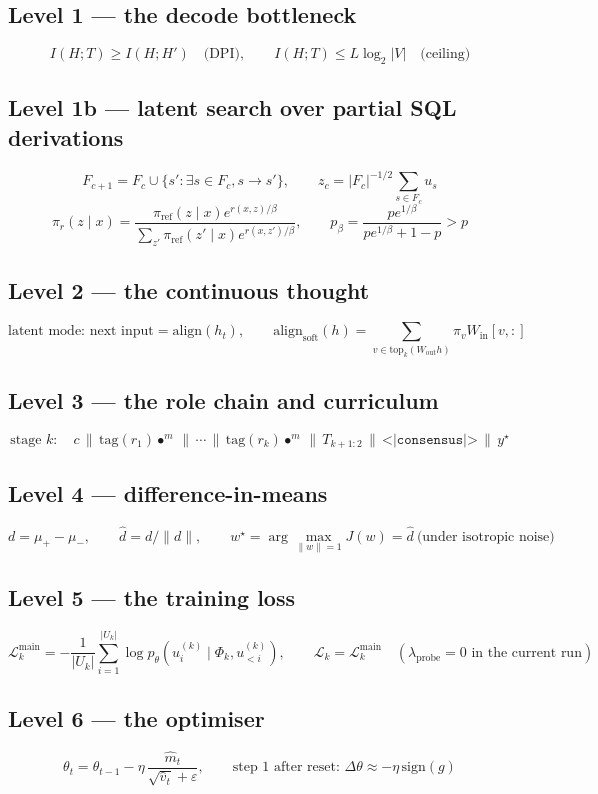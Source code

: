 \documentclass[11pt]{article}
\theoremstyle{definition}
\begin{document}
\subsection*{Level 1 --- the decode bottleneck}
\[
I(H;T) \ge I(H;H') \quad\text{(DPI)},\qquad
I(H;T) \le L\log_2|V| \quad\text{(ceiling)}
\]

\subsection*{Level 1b --- latent search over partial SQL derivations}
\[
F_{c+1}=F_c\cup\{s':\exists s\in F_c, s\to s'\},\qquad
z_c=|F_c|^{-1/2}\sum_{s\in F_c}u_s
\]
\[
\pi_r(z\mid x)=
\frac{\pi_{\mathrm{ref}}(z\mid x)e^{r(x,z)/\beta}}
{\sum_{z'}\pi_{\mathrm{ref}}(z'\mid x)e^{r(x,z')/\beta}},\qquad
p_\beta=\frac{pe^{1/\beta}}{pe^{1/\beta}+1-p}>p
\]

\subsection*{Level 2 --- the continuous thought}
\[
\text{latent mode: next input} = \mathrm{align}(h_t),\qquad
\mathrm{align}_{\mathrm{soft}}(h) = \sum_{v\in\mathrm{top}_k(W_{\mathrm{out}}h)} \pi_v W_{\mathrm{in}}[v,:]
\]

\subsection*{Level 3 --- the role chain and curriculum}
\[
\text{stage } k:\quad c \,\|\, \mathrm{tag}(r_1)\bullet^m \,\|\,\cdots\,\|\,\mathrm{tag}(r_k)\bullet^m \,\|\,T_{k+1:2}\,\|\, \texttt{<|consensus|>} \,\|\, y^\star
\]

\subsection*{Level 4 --- difference-in-means}
\[
d = \mu_+-\mu_-,\qquad \hat d = d/\|d\|,\qquad
w^\star = \arg\max_{\|w\|=1} J(w) = \hat d \ \text{(under isotropic noise)}
\]

\subsection*{Level 5 --- the training loss}
\[
\mathcal{L}^{\mathrm{main}}_k = -\frac1{|U_k|}\sum_{i=1}^{|U_k|} \log p_\theta(u_i^{(k)}\mid \Phi_k,u_{<i}^{(k)}),\qquad
\mathcal{L}_k = \mathcal{L}^{\mathrm{main}}_k\quad(\lambda_{\mathrm{probe}}=0\text{ in the current run})
\]

\subsection*{Level 6 --- the optimiser}
\[
\theta_t = \theta_{t-1} - \eta\,\frac{\hat m_t}{\sqrt{\hat v_t}+\varepsilon},\qquad
\text{step 1 after reset: } \Delta\theta \approx -\eta\,\mathrm{sign}(g)
\]
\end{document}
